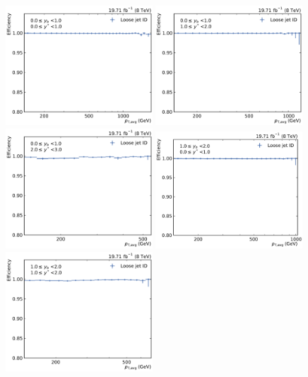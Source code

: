 \begin{figure}[htbp]
    \centering
    \includegraphics[width=0.49\textwidth]{figures/measurement/jetideff_yb0ys0.pdf}\hfill
    \includegraphics[width=0.49\textwidth]{figures/measurement/jetideff_yb0ys1.pdf}
    \includegraphics[width=0.49\textwidth]{figures/measurement/jetideff_yb0ys2.pdf}\hfill
    \includegraphics[width=0.49\textwidth]{figures/measurement/jetideff_yb1ys0.pdf}
    \includegraphics[width=0.49\textwidth]{figures/measurement/jetideff_yb1ys1.pdf}\hfill

\end{figure}
